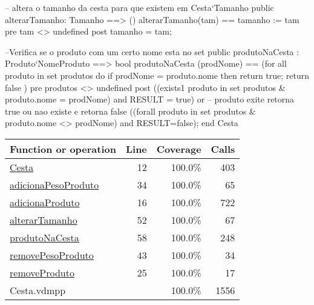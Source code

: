 \begin{vdmpp}[breaklines=true]
  -- altera o tamanho da cesta  para que existem em Cesta`Tamanho
  public alterarTamanho: Tamanho ==> ()
  alterarTamanho(tam)  == 
    tamanho := tam
  pre tam <> undefined
  post tamanho = tam; 
  
  --Verifica se o produto com um certo nome esta no set
  public produtoNaCesta : Produto`NomeProduto ==> bool
  produtoNaCesta (prodNome) == 
   (for all produto in set produtos
    do 
     if prodNome = produto.nome
       then return true;
    return false
   )
   pre produtos <> undefined
   post ((exists1 produto in set produtos & produto.nome = prodNome)  and   RESULT = true) or  --  produto exite retorna true ou nao existe e retorna false
      ((forall produto in set produtos & produto.nome <> prodNome) and RESULT=false); 
end Cesta
\end{vdmpp}
\bigskip
\begin{longtable}{|l|r|r|r|}
\hline
Function or operation & Line & Coverage & Calls \\
\hline
\hline
\hyperref[Cesta:12]{Cesta} & 12&100.0\% & 403 \\
\hline
\hyperref[adicionaPesoProduto:34]{adicionaPesoProduto} & 34&100.0\% & 65 \\
\hline
\hyperref[adicionaProduto:16]{adicionaProduto} & 16&100.0\% & 722 \\
\hline
\hyperref[alterarTamanho:52]{alterarTamanho} & 52&100.0\% & 67 \\
\hline
\hyperref[produtoNaCesta:58]{produtoNaCesta} & 58&100.0\% & 248 \\
\hline
\hyperref[removePesoProduto:43]{removePesoProduto} & 43&100.0\% & 34 \\
\hline
\hyperref[removeProduto:25]{removeProduto} & 25&100.0\% & 17 \\
\hline
\hline
Cesta.vdmpp & & 100.0\% & 1556 \\
\hline
\end{longtable}

